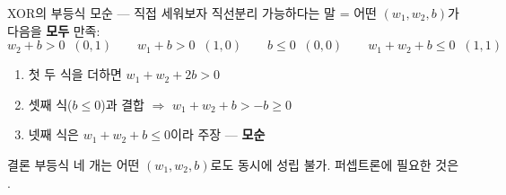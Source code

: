 \begin{frame}{XOR의 부등식 모순 — 직접 세워보자}
  \small
  직선분리 가능하다는 말 = 어떤 $(w_1, w_2, b)$가 다음을 \textbf{모두} 만족:
  \[
  w_2 + b > 0\;\; (0,1) \qquad
  w_1 + b > 0\;\; (1,0) \qquad
  b \le 0\;\; (0,0) \qquad
  w_1 + w_2 + b \le 0\;\; (1,1)
  \]
  \begin{enumerate}
    \item 첫 두 식을 더하면 $w_1 + w_2 + 2b > 0$
    \item 셋째 식($b \le 0$)과 결합 $\Rightarrow$ $w_1 + w_2 + b > -b \ge 0$
    \item 넷째 식은 $w_1 + w_2 + b \le 0$이라 주장 — \textbf{모순}
  \end{enumerate}
  \begin{block}{결론}
    부등식 네 개는 어떤 $(w_1, w_2, b)$로도 동시에 성립 불가.
    퍼셉트론에 필요한 것은 .
  \end{block}
\end{frame}
